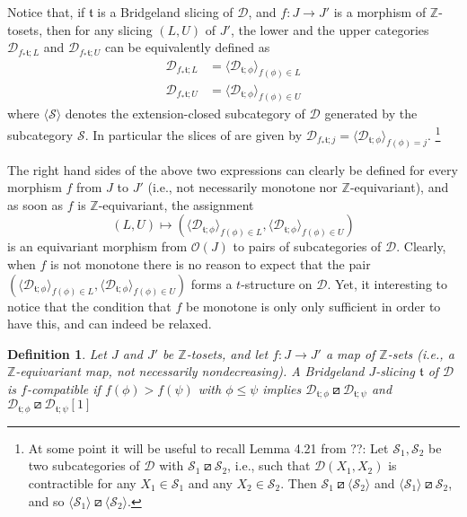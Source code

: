 \documentclass{article}
\newtheorem{defn}[thm]{Definition}
\theoremstyle{definition}
\newcommand{\Z}{\mathbb{Z}}
\newcommand{\tee}{\mathfrak{t}}
\newcommand{\orth}{\boxslash}
\begin{document}
Notice that, if $\tee$ is a Bridgeland slicing of $\mathscr{D}$, and $f\colon J\to J'$ is a morphism of $\Z$-tosets, then for any slicing $(L,U)$ of $J'$, the lower and the upper categories
$\mathscr{D}_{f_*\tee;L}$ and $\mathscr{D}_{f_*\tee;U}$ can be equivalently defined as
\begin{align*}
\mathscr{D}_{f_*\tee;L}&=\langle \mathscr{D}_{\tee;\phi}\rangle_{f(\phi)\in L}\\
\mathscr{D}_{f_*\tee;U}&=\langle \mathscr{D}_{\tee;\phi}\rangle_{f(\phi)\in U}
\end{align*}
where $\langle \mathscr{S}\rangle$ denotes the extension-closed subcategory of $\mathscr{D}$ generated by the subcategory $\mathscr{S}$. In particular the slices of are given by 
$\mathscr{D}_{f_*\tee;j}=\langle \mathscr{D}_{\tee;\phi}\rangle_{f(\phi)=j}$.
\footnote{
At some point it will be useful to recall Lemma 4.21 from ??:
Let $\mathscr{S}_1,\mathscr{S}_2$ be two subcategories of $\mathscr{D}$ with $\mathscr{S}_1\orth \mathscr{S}_2$, i.e., such that $\mathscr{D}(X_1,X_2)$ is contractible for any $X_1\in \mathscr{S}_1$ and any $X_2\in\mathscr{S}_2$. Then $\mathscr{S}_1\orth \langle\mathscr{S}_2\rangle$ and $\langle\mathscr{S}_1\rangle\orth \mathscr{S}_2$, and so $\langle\mathscr{S}_1\rangle\orth \langle\mathscr{S}_2\rangle$.}

The right hand sides of the above two expressions can clearly be defined for every morphism $f$ from $J$ to $J'$ (i.e., not necessarily monotone nor $\Z$-equivariant), and as soon as $f$ is $\Z$-equivariant, the assignment
\[
(L,U)\mapsto (\langle \mathscr{D}_{\tee;\phi}\rangle_{f(\phi)\in L},\langle \mathscr{D}_{\tee;\phi}\rangle_{f(\phi)\in U})
\]
is an equivariant morphism from $\mathcal{O}(J)$ to pairs of subcategories of $\mathscr{D}$. Clearly, when $f$ is not monotone there is no reason to expect that the pair $(\langle \mathscr{D}_{\tee;\phi}\rangle_{f(\phi)\in L},\langle \mathscr{D}_{\tee;\phi}\rangle_{f(\phi)\in U})$ forms a $t$-structure on $\mathscr{D}$. Yet, it interesting to notice that the condition that $f$ be monotone is only only sufficient in order to have this, and can indeed be relaxed.

\begin{defn}\label{compatible}
Let $J$ and $J'$ be $\Z$-tosets, and let $f\colon J\to J'$ a map of $\Z$-sets (i.e., a $\Z$-equivariant map, not necessarily nondecreasing). A Bridgeland $J$-slicing $\tee$ of $\mathscr{D}$ is \emph{$f$-compatible}
if $f(\phi)>f(\psi)$ with $\phi\leq \psi$ implies $\mathscr{D}_{\tee; \phi}\orth \mathscr{D}_{\tee;\psi}$ and $\mathscr{D}_{\tee; \phi}\orth \mathscr{D}_{\tee;\psi}[1]$
\end{defn}
\end{document}
